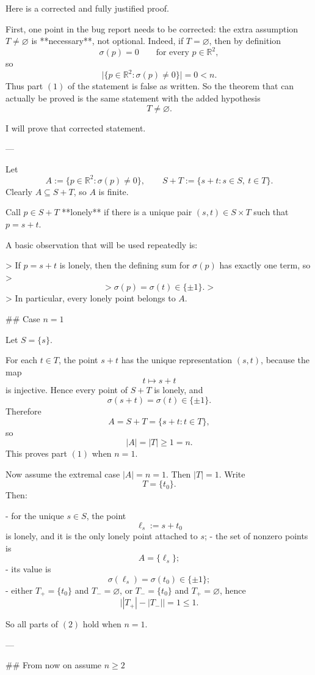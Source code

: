 Here is a corrected and fully justified proof.

First, one point in the bug report needs to be corrected: the extra assumption \(T\neq\varnothing\) is **necessary**, not optional.  
Indeed, if \(T=\varnothing\), then by definition
\[
\sigma(p)=0\qquad\text{for every }p\in\mathbb R^2,
\]
so
\[
\bigl|\{p\in\mathbb R^2:\sigma(p)\neq 0\}\bigr|=0<n.
\]
Thus part \((1)\) of the statement is false as written. So the theorem that can actually be proved is the same statement with the added hypothesis
\[
T\neq\varnothing.
\]

I will prove that corrected statement.

---

Let
\[
A:=\{p\in\mathbb R^2:\sigma(p)\neq 0\},
\qquad
S+T:=\{s+t:s\in S,\ t\in T\}.
\]
Clearly \(A\subseteq S+T\), so \(A\) is finite.

Call \(p\in S+T\) **lonely** if there is a unique pair \((s,t)\in S\times T\) such that \(p=s+t\).

A basic observation that will be used repeatedly is:

> If \(p=s+t\) is lonely, then the defining sum for \(\sigma(p)\) has exactly one term, so
> \[
> \sigma(p)=\sigma(t)\in\{\pm1\}.
> \]
> In particular, every lonely point belongs to \(A\).

## Case \(n=1\)

Let \(S=\{s\}\).

For each \(t\in T\), the point \(s+t\) has the unique representation \((s,t)\), because the map
\[
t\mapsto s+t
\]
is injective. Hence every point of \(S+T\) is lonely, and
\[
\sigma(s+t)=\sigma(t)\in\{\pm1\}.
\]
Therefore
\[
A=S+T=\{s+t:t\in T\},
\]
so
\[
|A|=|T|\ge 1=n.
\]
This proves part \((1)\) when \(n=1\).

Now assume the extremal case \(|A|=n=1\). Then \(|T|=1\). Write
\[
T=\{t_0\}.
\]
Then:

- for the unique \(s\in S\), the point
  \[
  \ell_s:=s+t_0
  \]
  is lonely, and it is the only lonely point attached to \(s\);
- the set of nonzero points is
  \[
  A=\{\ell_s\};
  \]
- its value is
  \[
  \sigma(\ell_s)=\sigma(t_0)\in\{\pm1\};
  \]
- either \(T_+=\{t_0\}\) and \(T_-=\varnothing\), or \(T_-=\{t_0\}\) and \(T_+=\varnothing\), hence
  \[
  \bigl||T_+|-|T_-|\bigr|=1\le 1.
  \]

So all parts of \((2)\) hold when \(n=1\).

---

## From now on assume \(n\ge 2\)

